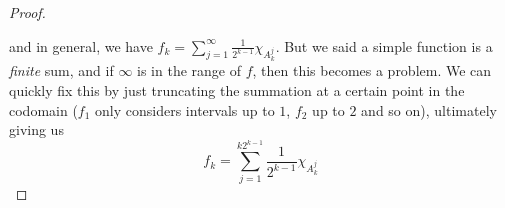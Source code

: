 \begin{proof}
\begin{center}
    \end{center}
    and in general, we have $f_k = \sum_{j=1}^\infty \frac{1}{2^{k-1}} \chi_{A^j_k}$. But we said a simple function is a \textit{finite} sum, and if $\infty$ is in the range of $f$, then this becomes a problem. We can quickly fix this by just truncating the summation at a certain point in the codomain ($f_1$ only considers intervals up to $1$, $f_2$ up to $2$ and so on), ultimately giving us 
    \begin{equation}
      f_k = \sum_{j=1}^{k 2^{k-1}} \frac{1}{2^{k-1}} \chi_{A^j_k} 
    \end{equation}
  \end{proof}

